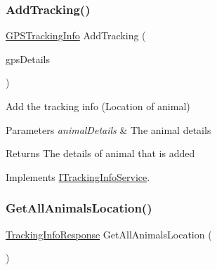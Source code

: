 \subsubsection{\texorpdfstring{Add\+Tracking()}{AddTracking()}}
{\footnotesize\ttfamily \hyperlink{classWildLifeTracker_1_1Models_1_1GPSTrackingInfo}{G\+P\+S\+Tracking\+Info} Add\+Tracking (\begin{DoxyParamCaption}\item[{\hyperlink{classWildLifeTracker_1_1Models_1_1GPSTrackingInfo}{G\+P\+S\+Tracking\+Info}}]{gps\+Details }\end{DoxyParamCaption})\hspace{0.3cm}{\ttfamily [inline]}}



Add the tracking info (Location of animal) 


\begin{DoxyParams}{Parameters}
{\em animal\+Details} & The animal details\\
\hline
\end{DoxyParams}
\begin{DoxyReturn}{Returns}
The details of animal that is added
\end{DoxyReturn}


Implements \hyperlink{interfaceWildLifeTracker_1_1Services_1_1ITrackingInfoService_a25bb0b990b8fd5649a97a10d14faecd2}{I\+Tracking\+Info\+Service}.

\mbox{\label{classWildLifeTracker_1_1Services_1_1TrackingInfoService_a858073f81f74fcdf93b69fe464b13e84}} 
\subsubsection{\texorpdfstring{Get\+All\+Animals\+Location()}{GetAllAnimalsLocation()}}
{\footnotesize\ttfamily \hyperlink{classWildLifeTracker_1_1Response_1_1TrackingInfoResponse}{Tracking\+Info\+Response} Get\+All\+Animals\+Location (\begin{DoxyParamCaption}{ }\end{DoxyParamCaption})\hspace{0.3cm}{\ttfamily [inline]}}



